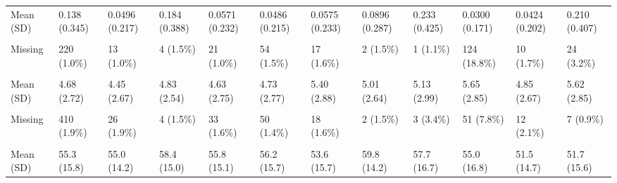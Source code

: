 \documentclass[
  single column]{article}
\begin{document}
\begin{landscape}
\begin{longtable}[t]{llllllllllll}
Mean (SD) & 0.138 (0.345) & 0.0496 (0.217) & 0.184 (0.388) & 0.0571 (0.232) & 0.0486 (0.215) & 0.0575 (0.233) & 0.0896 (0.287) & 0.233 (0.425) & 0.0300 (0.171) & 0.0424 (0.202) & 0.210 (0.407)\\
\addlinespace
\cellcolor{gray!10}{Median [Min, Max]} & \cellcolor{gray!10}{0 [0, 1.00]} & \cellcolor{gray!10}{0 [0, 1.00]} & \cellcolor{gray!10}{0 [0, 1.00]} & \cellcolor{gray!10}{0 [0, 1.00]} & \cellcolor{gray!10}{0 [0, 1.00]} & \cellcolor{gray!10}{0 [0, 1.00]} & \cellcolor{gray!10}{0 [0, 1.00]} & \cellcolor{gray!10}{0 [0, 1.00]} & \cellcolor{gray!10}{0 [0, 1.00]} & \cellcolor{gray!10}{0 [0, 1.00]} & \cellcolor{gray!10}{0 [0, \vphantom{1} 1.00]}\\
Missing & 220 (1.0\%) & 13 (1.0\%) & 4 (1.5\%) & 21 (1.0\%) & 54 (1.5\%) & 17 (1.6\%) & 2 (1.5\%) & 1 (1.1\%) & 124 (18.8\%) & 10 (1.7\%) & 24 (3.2\%)\\
\cellcolor{gray!10}{nz\_dep2018} & \cellcolor{gray!10}{} & \cellcolor{gray!10}{} & \cellcolor{gray!10}{} & \cellcolor{gray!10}{} & \cellcolor{gray!10}{} & \cellcolor{gray!10}{} & \cellcolor{gray!10}{} & \cellcolor{gray!10}{} & \cellcolor{gray!10}{} & \cellcolor{gray!10}{} & \cellcolor{gray!10}{}\\
Mean (SD) & 4.68 (2.72) & 4.45 (2.67) & 4.83 (2.54) & 4.63 (2.75) & 4.73 (2.77) & 5.40 (2.88) & 5.01 (2.64) & 5.13 (2.99) & 5.65 (2.85) & 4.85 (2.67) & 5.62 (2.85)\\
\cellcolor{gray!10}{Median [Min, Max]} & \cellcolor{gray!10}{4.00 [1.00, 10.0]} & \cellcolor{gray!10}{4.00 [1.00, 10.0]} & \cellcolor{gray!10}{5.00 [1.00, 10.0]} & \cellcolor{gray!10}{4.00 [1.00, 10.0]} & \cellcolor{gray!10}{4.00 [1.00, 10.0]} & \cellcolor{gray!10}{5.00 [1.00, 10.0]} & \cellcolor{gray!10}{5.00 [1.00, 10.0]} & \cellcolor{gray!10}{5.00 [1.00, 10.0]} & \cellcolor{gray!10}{6.00 [1.00, 10.0]} & \cellcolor{gray!10}{5.00 [1.00, 10.0]} & \cellcolor{gray!10}{6.00 [1.00, 10.0]}\\
\addlinespace
Missing & 410 (1.9\%) & 26 (1.9\%) & 4 (1.5\%) & 33 (1.6\%) & 50 (1.4\%) & 18 (1.6\%) & 2 (1.5\%) & 3 (3.4\%) & 51 (7.8\%) & 12 (2.1\%) & 7 (0.9\%)\\
\cellcolor{gray!10}{nzsei\_13\_l} & \cellcolor{gray!10}{} & \cellcolor{gray!10}{} & \cellcolor{gray!10}{} & \cellcolor{gray!10}{} & \cellcolor{gray!10}{} & \cellcolor{gray!10}{} & \cellcolor{gray!10}{} & \cellcolor{gray!10}{} & \cellcolor{gray!10}{} & \cellcolor{gray!10}{} & \cellcolor{gray!10}{}\\
Mean (SD) & 55.3 (15.8) & 55.0 (14.2) & 58.4 (15.0) & 55.8 (15.1) & 56.2 (15.7) & 53.6 (15.7) & 59.8 (14.2) & 57.7 (16.7) & 55.0 (16.8) & 51.5 (14.7) & 51.7 (15.6)\\

\end{longtable}
\end{landscape}
\end{document}
